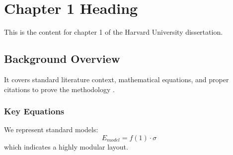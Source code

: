 \chapter{Chapter 1 Heading}
\label{ch:chapter1}
This is the content for chapter 1 of the Harvard University dissertation.

\section{Background Overview}
It covers standard literature context, mathematical equations, and proper citations to prove the methodology \cite{texbook}.

\subsection{Key Equations}
We represent standard models:
\begin{equation}
    E_{model} = f(1) \cdot \sigma
\end{equation}
which indicates a highly modular layout.
